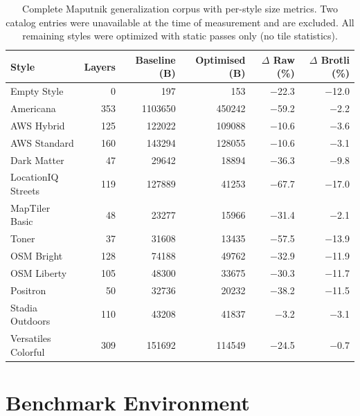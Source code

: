 \begin{table}[htbp]
\centering
\small
\begin{tabular}{l r r r r r}
\toprule
\textbf{Style} & \textbf{Layers} & \textbf{Baseline (B)} & \textbf{Optimised (B)} & \textbf{$\Delta$ Raw (\%)} & \textbf{$\Delta$ Brotli (\%)} \\
\midrule
Empty Style          &   0 &           197 &           153 & \num{-22.3} & \num{-12.0} \\
Americana            & 353 & \num{1103650} &    \num{450242} & \num{-59.2} &  \num{-2.2} \\
AWS Hybrid           & 125 &    \num{122022} &    \num{109088} & \num{-10.6} &  \num{-3.6} \\
AWS Standard         & 160 &    \num{143294} &    \num{128055} & \num{-10.6} &  \num{-3.1} \\
Dark Matter          &  47 &     \num{29642} &     \num{18894} & \num{-36.3} &  \num{-9.8} \\
LocationIQ Streets   & 119 &    \num{127889} &     \num{41253} & \num{-67.7} & \num{-17.0} \\
MapTiler Basic       &  48 &     \num{23277} &     \num{15966} & \num{-31.4} &  \num{-2.1} \\
Toner                &  37 &     \num{31608} &     \num{13435} & \num{-57.5} & \num{-13.9} \\
OSM Bright           & 128 &     \num{74188} &     \num{49762} & \num{-32.9} & \num{-11.9} \\
OSM Liberty          & 105 &     \num{48300} &     \num{33675} & \num{-30.3} & \num{-11.7} \\
Positron             &  50 &     \num{32736} &     \num{20232} & \num{-38.2} & \num{-11.5} \\
Stadia Outdoors      & 110 &     \num{43208} &     \num{41837} &  \num{-3.2} &  \num{-3.1} \\
Versatiles Colorful  & 309 &    \num{151692} &    \num{114549} & \num{-24.5} &  \num{-0.7} \\
\bottomrule
\end{tabular}
\caption{
Complete Maputnik generalization corpus with per-style size metrics.
Two catalog entries were unavailable at the time of measurement and are excluded.
All remaining styles were optimized with static passes only (no tile statistics).}
\label{tab:maputnik_full}
\end{table}

\clearpage
\section{Benchmark Environment}\label{app:bench_env}

